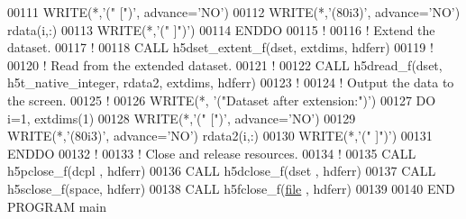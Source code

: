 \begin{DoxyCode}
00111      \textcolor{keyword}{WRITE}(*,\textcolor{stringliteral}{'(" [")'}, advance=\textcolor{stringliteral}{'NO'})
00112      \textcolor{keyword}{WRITE}(*,\textcolor{stringliteral}{'(80i3)'}, advance=\textcolor{stringliteral}{'NO'}) rdata(i,:)
00113      \textcolor{keyword}{WRITE}(*,\textcolor{stringliteral}{'(" ]")'})
00114 \textcolor{keywordflow}{  ENDDO}
00115   \textcolor{comment}{!}
00116   \textcolor{comment}{! Extend the dataset.}
00117   \textcolor{comment}{!}
00118   \textcolor{keyword}{CALL }h5dset\_extent\_f(dset, extdims, hdferr)
00119   \textcolor{comment}{!}
00120   \textcolor{comment}{! Read from the extended dataset.}
00121   \textcolor{comment}{!}
00122   \textcolor{keyword}{CALL }h5dread\_f(dset, h5t\_native\_integer, rdata2, extdims, hdferr)
00123   \textcolor{comment}{!}
00124   \textcolor{comment}{! Output the data to the screen.}
00125   \textcolor{comment}{!}
00126   \textcolor{keyword}{WRITE}(*, \textcolor{stringliteral}{'("Dataset after extension:")'})
00127   \textcolor{keywordflow}{DO} i=1, extdims(1)
00128      \textcolor{keyword}{WRITE}(*,\textcolor{stringliteral}{'(" [")'}, advance=\textcolor{stringliteral}{'NO'})
00129      \textcolor{keyword}{WRITE}(*,\textcolor{stringliteral}{'(80i3)'}, advance=\textcolor{stringliteral}{'NO'}) rdata2(i,:)
00130      \textcolor{keyword}{WRITE}(*,\textcolor{stringliteral}{'(" ]")'})
00131 \textcolor{keywordflow}{  ENDDO}
00132   \textcolor{comment}{!}
00133   \textcolor{comment}{! Close and release resources.}
00134   \textcolor{comment}{!}
00135   \textcolor{keyword}{CALL }h5pclose\_f(dcpl , hdferr)
00136   \textcolor{keyword}{CALL }h5dclose\_f(dset , hdferr)
00137   \textcolor{keyword}{CALL }h5sclose\_f(space, hdferr)
00138   \textcolor{keyword}{CALL }h5fclose\_f(\hyperlink{structfile}{file} , hdferr)
00139 
00140 \textcolor{keyword}{END PROGRAM }main
\end{DoxyCode}

